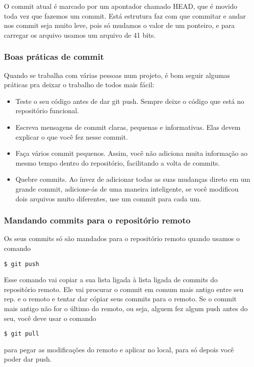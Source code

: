 \documentclass{article}
\begin{document}
    O commit atual é marcado por um apontador chamado HEAD, que é movido toda vez
que fazemos um commit. Está estrutura faz com que commitar e andar nos commit seja
muito leve, pois só mudamos o valor de um ponteiro, e para carregar os arquivo usamos
um arquivo de 41 bits.

\subsubsection{Boas práticas de commit}
    Quando se trabalha com várias pessoas num projeto, é bom seguir algumas práticas
pra deixar o trabalho de todos mais fácil:
    \begin{itemize}
        \item Teste o seu código antes de dar git push. Sempre deixe o código que 
                está no repositório funcional.
        \item Escreva mensagens de commit claras, pequenas e informativas. Elas devem
                explicar o que você fez nesse commit.
        \item Faça vários commit pequenos. Assim, você não adiciona muita informação
                ao mesmo tempo dentro do repositório, facilitando a volta de commits. %
        \item Quebre commits. Ao ínvez de adicionar todas as suas mudanças direto em um grande commit,
                adicione-ás de uma maneira inteligente, se você modificou dois arquivos muito diferentes,
                use um commit para cada um.
    \end{itemize}

\subsubsection{Mandando commits para o repositório remoto}
    Os seus commits só são mandados para o repositório remoto quando usamos o comando
\begin{tabbing}
    \hspace{1cm}\=\verb#$ git push#
\end{tabbing}
    
    Esse comando vai copiar a sua lista ligada à lista ligada de commits do repositório remoto.
Ele vai procurar o commit em comum mais antigo entre seu rep. e o remoto e tentar dar cópiar seus
commits para o remoto. Se o commit mais antigo não for o último do remoto, ou seja, alguem fez algum
push antes do seu, você deve usar o comando  
\begin{tabbing}
    \hspace{1cm}\=\verb#$ git pull#
\end{tabbing}
para pegar as modificações do remoto e aplicar no local, para só depois você poder dar push.
\end{document}

